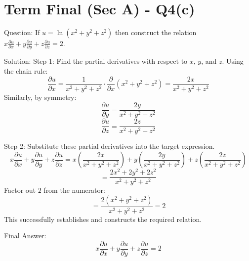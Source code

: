 \documentclass{article}
\begin{document}
\section*{Term Final (Sec A) - Q4(c)}
Question:
If $u = \ln(x^2+y^2+z^2)$ then construct the relation $x\frac{\partial u}{\partial x} + y\frac{\partial u}{\partial y} + z\frac{\partial u}{\partial z} = 2$.

Solution:
Step 1: Find the partial derivatives with respect to $x$, $y$, and $z$.
Using the chain rule:
\[
\frac{\partial u}{\partial x} = \frac{1}{x^2+y^2+z^2} \cdot \frac{\partial}{\partial x}(x^2+y^2+z^2) = \frac{2x}{x^2+y^2+z^2}
\]
Similarly, by symmetry:
\[
\frac{\partial u}{\partial y} = \frac{2y}{x^2+y^2+z^2}
\]
\[
\frac{\partial u}{\partial z} = \frac{2z}{x^2+y^2+z^2}
\]

Step 2: Substitute these partial derivatives into the target expression.
\[
x\frac{\partial u}{\partial x} + y\frac{\partial u}{\partial y} + z\frac{\partial u}{\partial z} = x\left(\frac{2x}{x^2+y^2+z^2}\right) + y\left(\frac{2y}{x^2+y^2+z^2}\right) + z\left(\frac{2z}{x^2+y^2+z^2}\right)
\]
\[
= \frac{2x^2 + 2y^2 + 2z^2}{x^2+y^2+z^2}
\]
Factor out $2$ from the numerator:
\[
= \frac{2(x^2+y^2+z^2)}{x^2+y^2+z^2} = 2
\]
This successfully establishes and constructs the required relation.

Final Answer:
\[
\boxed{x\frac{\partial u}{\partial x} + y\frac{\partial u}{\partial y} + z\frac{\partial u}{\partial z} = 2}
\]
\end{document}
